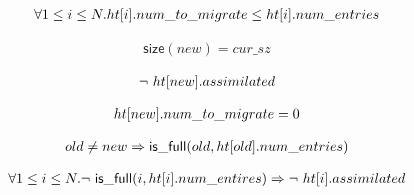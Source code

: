 \begin{lemma}
  \begin{equation*}
\begin{array}{l}        
  \forall 1 \leq i \leq N. \mbox{$ht[i]$}.num\_to\_migrate \leq \mbox{$ht[i]$}.num\_entries
\end{array}
\end{equation*}  
\label{num_to_migrate_and_num_entries}
\end{lemma}  

\begin{lemma}
  \begin{equation*}
\begin{array}{l}        
  \mathsf{size}(new) = cur\_sz
\end{array}
\end{equation*}  
\label{table_sizes}
\end{lemma}  

\begin{lemma}
  \begin{equation*}
\begin{array}{l}        
  \mbox{$\neg\ \mbox{$ht[new]$}.assimilated$}
\end{array}
\end{equation*}  
\label{new_cannot_be_assimilated}
\end{lemma}  

\begin{lemma}
  \begin{equation*}
\begin{array}{l}      
  \mbox{$ht[new]$}.num\_to\_migrate = 0
\end{array}
\end{equation*}  
\label{new_cannot_migrate}
\end{lemma}  

\begin{lemma}
  \begin{equation*}
\begin{array}{l}        
  old \neq new \Rightarrow \mathsf{is\_full}(old, \mbox{$ht[old]$}.num\_entries)
\end{array}
  \end{equation*}  
  \label{old_is_full}
\end{lemma}  

\begin{lemma}
  \begin{equation*}
\begin{array}{l}      
  \forall 1 \leq i \leq N. \mbox{$\neg\ \mathsf{is\_full}(i,\mbox{$ht[i]$}.num\_entires)$} \Rightarrow \mbox{$\neg\ \mbox{$ht[i]$}.assimilated$}
  \end{array}
\end{equation*}
  \label{not_full_cannot_be_assimilated}  
\end{lemma}  

